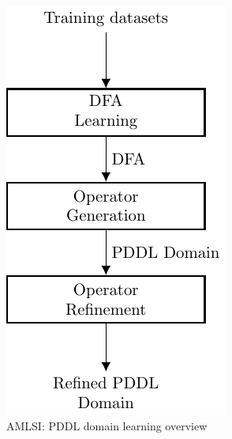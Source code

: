 \begin{figure}
    \centering
    \begin{subfigure}[b]{0.2\linewidth}
        \centering
        \includegraphics[width=.9\linewidth]{pics/out/amlsi_steps.pdf}
        \caption{AMLSI: {\sf PDDL} domain learning overview}
        \label{fig:contributions:pddl}
    \end{subfigure}
    \begin{subfigure}[b]{.4\linewidth}
        \centering

\end{subfigure}
\end{figure}
